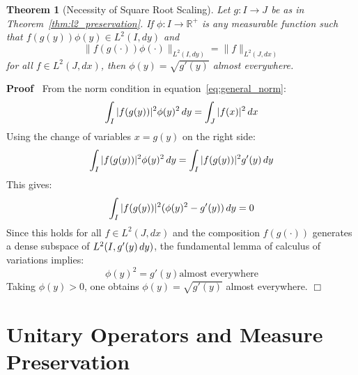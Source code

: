 \documentclass{article}
\newenvironment{proof}{\noindent\textbf{Proof\ }}{\hspace*{\fill}$\Box$\medskip}
\newtheorem{theorem}{Theorem}
\begin{document}
\begin{theorem}
  [Necessity of Square Root Scaling]\label{thm:necessity}Let $g : I \to J$ be
  as in Theorem~\ref{thm:l2_preservation}. If $\phi : I \to \mathbb{R}^+$ is
  any measurable function such that $f (g (y)) \phi (y) \in L^2 (I, dy)$ and
  \begin{equation}
    \label{eq:general_norm} \|f (g (\cdot)) \phi (\cdot)\|_{L^2 (I, dy)} =
    \|f\|_{L^2 (J, dx)}
  \end{equation}
  for all $f \in L^2 (J, dx)$, then $\phi (y) = \sqrt{g' (y)}$ almost
  everywhere.
\end{theorem}

\begin{proof}
  From the norm condition in equation~\eqref{eq:general_norm}:
  \begin{equation}
    \label{eq:phi_condition} \int_I |f (g (y)) |^2 \phi (y)^2  \hspace{0.17em}
    dy = \int_J |f (x) |^2  \hspace{0.17em} dx
  \end{equation}
  Using the change of variables $x = g (y)$ on the right side:
  \begin{equation}
    \label{eq:phi_comparison} \int_I |f (g (y)) |^2 \phi (y)^2 
    \hspace{0.17em} dy = \int_I |f (g (y)) |^2 g' (y)  \hspace{0.17em} dy
  \end{equation}
  This gives:
  \begin{equation}
    \label{eq:phi_difference} \int_I |f (g (y)) |^2  (\phi (y)^2 - g' (y)) 
    \hspace{0.17em} dy = 0
  \end{equation}
  Since this holds for all $f \in L^2 (J, dx)$ and the composition $f (g
  (\cdot))$ generates a dense subspace of $L^2 (I, g' (y) \hspace{0.17em}
  dy)$, the fundamental lemma of calculus of variations implies:
  \begin{equation}
    \label{eq:phi_ae_equal} \phi (y)^2 = g' (y) \text{almost everywhere}
  \end{equation}
  Taking $\phi (y) > 0$, one obtains $\phi (y) = \sqrt{g' (y)}$ almost
  everywhere.
\end{proof}

\section{Unitary Operators and Measure Preservation}
\end{document}
